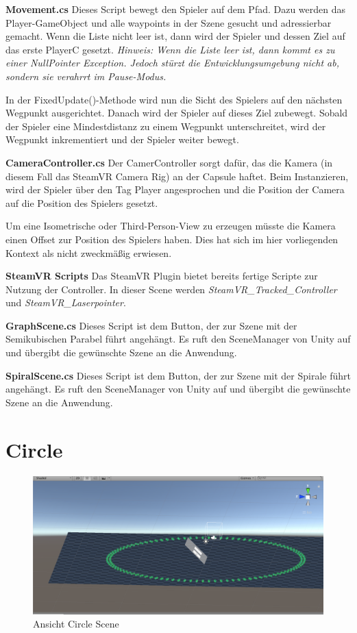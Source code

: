 \textbf{Movement.cs}
Dieses Script bewegt den Spieler auf dem Pfad. Dazu werden das Player-GameObject und alle waypoints in der Szene gesucht und adressierbar gemacht.
Wenn die Liste nicht leer ist, dann wird der Spieler und dessen Ziel auf das erste PlayerC gesetzt. 
\emph{Hinweis: Wenn die Liste leer ist, dann kommt es zu einer NullPointer Exception. Jedoch stürzt die Entwicklungsumgebung nicht ab, sondern sie verahrrt im Pause-Modus.}

In der FixedUpdate()-Methode wird nun die Sicht des Spielers auf den nächsten Wegpunkt ausgerichtet. Danach wird der Spieler auf dieses Ziel zubewegt. Sobald der Spieler eine Mindestdistanz zu einem Wegpunkt unterschreitet, wird der Wegpunkt inkrementiert und der Spieler weiter bewegt.

\textbf{CameraController.cs}
Der CamerController sorgt dafür, das die Kamera (in diesem Fall das SteamVR Camera Rig) an der Capsule haftet. Beim Instanzieren, wird der Spieler über den Tag \glqq Player\grqq{} angesprochen und die Position der Camera auf die Position des Spielers gesetzt. 

Um eine Isometrische oder Third-Person-View zu erzeugen müsste die Kamera einen Offset zur Position des Spielers haben. Dies hat sich im hier vorliegenden Kontext als nicht zweckmäßig erwiesen. 

\textbf{SteamVR Scripts}
Das SteamVR Plugin bietet bereits fertige Scripte zur Nutzung der Controller. In dieser Scene werden \emph{SteamVR\_Tracked\_Controller} und \emph{SteamVR\_Laserpointer}. 


\textbf{GraphScene.cs}
Dieses Script ist dem Button, der zur Szene mit der Semikubischen Parabel führt angehängt. Es ruft den SceneManager von Unity auf und übergibt die gewünschte Szene an die Anwendung.

\textbf{SpiralScene.cs}
Dieses Script ist dem Button, der zur Szene mit der Spirale führt angehängt. Es ruft den SceneManager von Unity auf und übergibt die gewünschte Szene an die Anwendung.


\section{Circle}
\label{Kreis}

\begin{figure}[h!]
	\includegraphics[scale=0.5]{bilder/CircleScene.png}
	\caption{Ansicht Circle Scene}
\end{figure}


